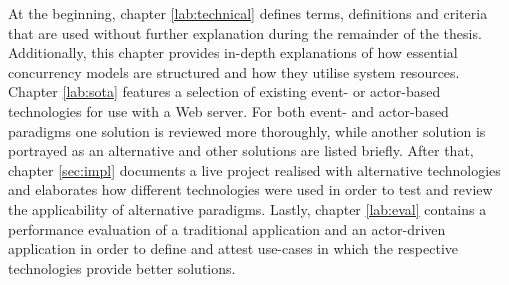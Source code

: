 At the beginning, chapter \ref{lab:technical} defines terms, definitions and criteria that are used without further explanation during the remainder of the thesis. Additionally, this chapter provides in-depth explanations of how essential concurrency models are structured and how they utilise system resources. Chapter \ref{lab:sota} features a selection of existing event- or actor-based technologies for use with a Web server. For both event- and actor-based paradigms one solution is reviewed more thoroughly, while another solution is portrayed as an alternative and other solutions are listed briefly. After that, chapter \ref{sec:impl} documents a live project realised with alternative technologies and elaborates how different technologies were used in order to test and review the applicability of alternative paradigms. Lastly, chapter \ref{lab:eval} contains a performance evaluation of a traditional application and an actor-driven application in order to define and attest use-cases in which the respective technologies provide better solutions.







